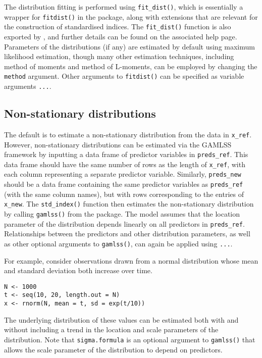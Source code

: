 The distribution fitting is performed using \texttt{fit\_dist()}, which is essentially a wrapper for \texttt{fitdist()} in the  package, along with extensions that are relevant for the construction of standardised indices. The \texttt{fit\_dist()} function is also exported by , and further details can be found on the associated help page. Parameters of the distributions (if any) are estimated by default using maximum likelihood estimation, though many other estimation techniques, including method of moments and method of L-moments, can be employed by changing the \texttt{method} argument. Other arguments to \texttt{fitdist()} can be specified as variable arguments \texttt{...}.

\subsection{Non-stationary distributions}\label{non-stationary-distributions}

The default is to estimate a non-stationary distribution from the data in \texttt{x\_ref}. However, non-stationary distributions can be estimated via the GAMLSS framework by inputting a data frame of predictor variables in \texttt{preds\_ref}. This data frame should have the same number of rows as the length of \texttt{x\_ref}, with each column representing a separate predictor variable. Similarly, \texttt{preds\_new} should be a data frame containing the same predictor variables as \texttt{preds\_ref} (with the same column names), but with rows corresponding to the entries of \texttt{x\_new}. The \texttt{std\_index()} function then estimates the non-stationary distribution by calling \texttt{gamlss()} from the  package. The model assumes that the location parameter of the distribution depends linearly on all predictors in \texttt{preds\_ref}. Relationships between the predictors and other distribution parameters, as well as other optional arguments to \texttt{gamlss()}, can again be applied using \texttt{...}.

For example, consider observations drawn from a normal distribution whose mean and standard deviation both increase over time.

\begin{verbatim}
N <- 1000
t <- seq(10, 20, length.out = N)
x <- rnorm(N, mean = t, sd = exp(t/10))
\end{verbatim}

The underlying distribution of these values can be estimated both with and without including a trend in the location and scale parameters of the distribution. Note that \texttt{sigma.formula} is an optional argument to \texttt{gamlss()} that allows the scale parameter of the distribution to depend on predictors.

